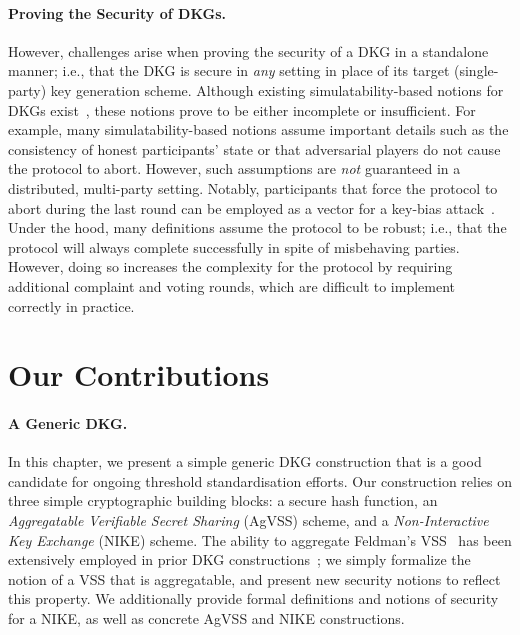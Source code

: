 \paragraph{Proving the Security of DKGs.}
However,
challenges arise when proving the security of a DKG in a standalone manner;
i.e., that the DKG is secure in \emph{any} setting in place of its target (single-party) key generation scheme.
Although existing simulatability-based notions for DKGs exist~\cite{GennaroJKR07,GurkanJMMST21,Lindell22,BachoL22,BonehS2020,BendlinKP13},
these notions prove to be either incomplete or insufficient.
For example,
many simulatability-based notions assume important details such as the
consistency of honest participants' state or that adversarial players do not cause the protocol to abort.
However, such assumptions are \emph{not} guaranteed in a distributed, multi-party setting.
Notably, participants that force the protocol to abort during the last round
can be employed as a vector for a key-bias attack~\cite{GennaroJKR07}.
Under the hood, many definitions assume the protocol to be robust;
i.e., that the protocol will always complete successfully in spite of misbehaving parties.
However, doing so increases the complexity for the protocol
by requiring additional complaint and voting rounds, which are difficult to
implement correctly in practice.


\section{Our Contributions}

\paragraph{A Generic DKG.}
In this chapter, we present a simple generic DKG construction that is a good candidate for ongoing threshold standardisation efforts.
Our construction relies on three simple cryptographic building blocks:
a secure hash function,
an \emph{Aggregatable Verifiable Secret Sharing} (AgVSS) scheme,
and a \emph{Non-Interactive Key Exchange} (NIKE) scheme.
The ability to aggregate Feldman's VSS~\cite{Feldman87}  has been extensively employed in prior DKG
constructions~\cite{Pedersen91,GennaroJKR07,KomloG20,GurkanJMMST21,Lindell22};
we simply formalize the notion of a VSS that is aggregatable,
and present new security notions to reflect this property.
We additionally provide formal definitions and notions of security for a NIKE,
as well as concrete AgVSS and NIKE constructions.

